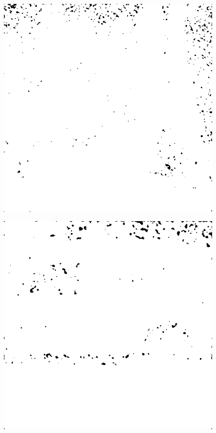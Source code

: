 \begin{figure}[H]
    \centering
\begin{minipage}[t]{0.245\textwidth}
    \includegraphics[width=1\textwidth]{result/SPC_NRQA/g64_512_m30.PNG}
    \subcaption{}
    \label{fig:good1}
\end{minipage}
\begin{minipage}[t]{0.245\textwidth}
    \includegraphics[width = \textwidth]{result/SPC_NRQA/g24_512_m30.PNG}

\end{minipage}
\end{figure}
